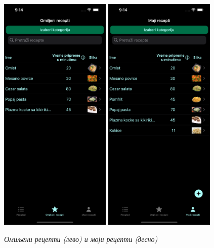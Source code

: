 \documentclass[12pt,oneside]{memoir}
\begin{document}
\begin{figure} [H]
    \centering
    \captionsetup{justification=centering}
    \includegraphics[width=0.475\textwidth]{images/simulators/testing images/favorite recipes.png}
    \hfill
    \includegraphics[width=0.475\textwidth]{images/simulators/testing images/my recipes.png}
    \caption{\textit{Омиљени рецепти (лево) и моји рецепти (десно)}}
    \label{slika:приказ_омиљених_рецепата}
\end{figure}
\end{document}
